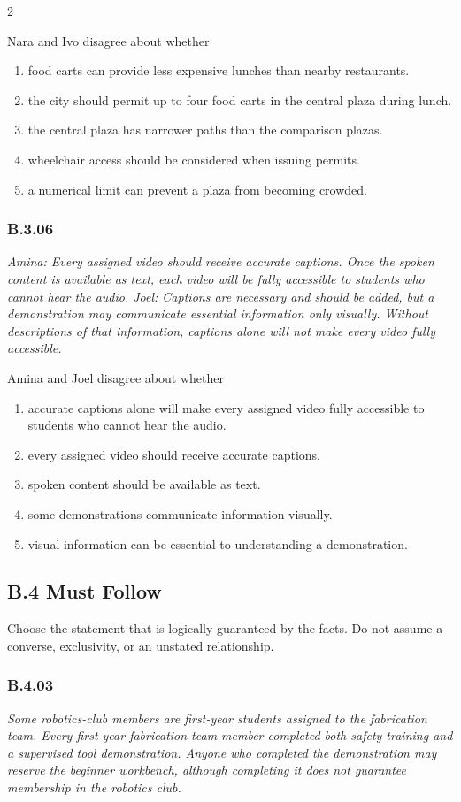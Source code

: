 \documentclass[10pt]{extarticle}
\newcommand{\choice}[1]{\item #1}
\newcommand{\bankitem}[1]{\subsubsection*{#1}}
\begin{document}
\begin{multicols}{2}
\begin{samepage}
Nara and Ivo disagree about whether
\begin{enumerate}[label=(\alph*)]
  \choice{food carts can provide less expensive lunches than nearby restaurants.}
  \choice{the city should permit up to four food carts in the central plaza during lunch.}
  \choice{the central plaza has narrower paths than the comparison plazas.}
  \choice{wheelchair access should be considered when issuing permits.}
  \choice{a numerical limit can prevent a plaza from becoming crowded.}
\end{enumerate}
\end{samepage}\par\smallskip
\begin{samepage}
\bankitem{B.3.06}
\emph{Amina: Every assigned video should receive accurate captions. Once the spoken content is available as text, each video will be fully accessible to students who cannot hear the audio. Joel: Captions are necessary and should be added, but a demonstration may communicate essential information only visually. Without descriptions of that information, captions alone will not make every video fully accessible.}

Amina and Joel disagree about whether
\begin{enumerate}[label=(\alph*)]
  \choice{accurate captions alone will make every assigned video fully accessible to students who cannot hear the audio.}
  \choice{every assigned video should receive accurate captions.}
  \choice{spoken content should be available as text.}
  \choice{some demonstrations communicate information visually.}
  \choice{visual information can be essential to understanding a demonstration.}
\end{enumerate}
\end{samepage}\par\smallskip
\subsection*{B.4 Must Follow}
Choose the statement that is logically guaranteed by the facts. Do not assume a converse, exclusivity, or an unstated relationship.
\begin{samepage}
\bankitem{B.4.03}
\emph{Some robotics-club members are first-year students assigned to the fabrication team. Every first-year fabrication-team member completed both safety training and a supervised tool demonstration. Anyone who completed the demonstration may reserve the beginner workbench, although completing it does not guarantee membership in the robotics club.}


\end{samepage}
\end{multicols}
\end{document}
